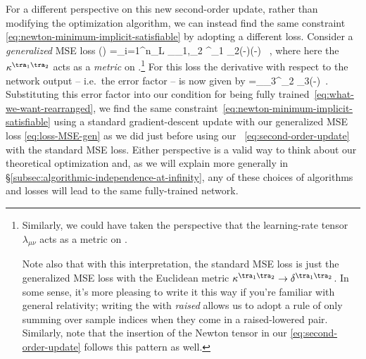For a different perspective on this new second-order update, rather than modifying the optimization algorithm, we can instead find the same constraint \eqref{eq:newton-minimum-implicit-satisfiable} by adopting a different loss. Consider a \emph{generalized} MSE loss
\be\label{eq:loss-MSE-gen}
\Laux{\A}(\theta) =\sum_{i=1}^{n_L} \sum_{\tra_1,\tra_2 \in \A}\kappa^{\tra_1 \tra_2}\le(-\ri)\le(-\ri) \, ,
\ee
where here the  $\kappa^{\tra_1 \tra_2}$ acts as a \emph{metric} on .\footnote{Similarly, we could have taken the perspective that the learning-rate tensor $\lambda_{\mu\nu}$ acts as a metric on .

Note also that with this interpretation, the standard MSE loss is just the generalized MSE loss with the Euclidean metric $\kappa^{\tra_1 \tra_2} \to \delta^{\tra_1 \tra_2}$. In some sense, it's more pleasing to write it this way if you're familiar with general relativity; writing the  with  \emph{raised} allows us to adopt a rule of only summing over sample indices when they come in a raised-lowered pair. Similarly, note that the insertion of the Newton tensor in our  \eqref{eq:second-order-update} follows this pattern as well.
} For this loss the derivative with respect to the network output -- i.e.~the error factor --
is now given by
\be
{}=\sum_{\tra_3\in\A}\kappa^{\tra_2 \tra_3}\le(-\ri)\, .
\ee
Substituting this error factor into our condition for being fully trained~\eqref{eq:what-we-want-rearranged}, we find the same constraint~\eqref{eq:newton-minimum-implicit-satisfiable} using a standard gradient-descent update with our generalized MSE loss \eqref{eq:loss-MSE-gen} as we did just before using our ~\eqref{eq:second-order-update} with the standard MSE loss. Either perspective is a valid way to think about our theoretical optimization and, as we will explain more generally in \S\ref{subsec:algorithmic-independence-at-infinity},  any of these choices of algorithms and losses will lead to the same fully-trained network.








